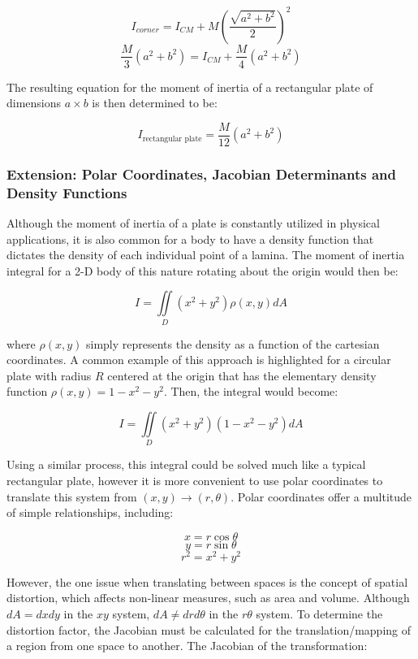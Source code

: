 \[I_{corner} = I_{CM} + M\left(\frac{\sqrt{a^2+b^2}}{2}\right)^2\]
\[\frac{M}{3}\left(a^2+b^2\right) = I_{CM} + \frac{M}{4}\left(a^2+b^2\right)\]

The resulting equation for the moment of inertia of a rectangular plate of dimensions $a \times b$ is then determined to be:

\begin{equation}
I_{\text{rectangular plate}} = \frac{M}{12}\left(a^2+b^2\right)
\label{eq:final_moment_rectangular_plate}
\end{equation}

\subsubsection{Extension: Polar Coordinates, Jacobian Determinants and Density Functions}

Although the moment of inertia of a plate is constantly utilized in physical applications, it is also common for a body to have a density function that dictates the density of each individual point of a lamina. The moment of inertia integral for a 2-D body of this nature rotating about the origin would then be:

\[I = \iint\limits_{D} (x^2+y^2)\rho(x,y) dA\]

where $\rho(x,y)$ simply represents the density as a function of the cartesian coordinates. A common example of this approach is highlighted for a circular plate with radius $R$ centered at the origin that has the elementary density function $\rho(x,y) = 1 - x^2 - y^2$. Then, the integral would become:

\[I = \iint\limits_{D} (x^2+y^2)(1 - x^2 - y^2) dA\]

Using a similar process, this integral could be solved much like a typical rectangular plate, however it is more convenient to use polar coordinates to translate this system from $(x,y) \rightarrow (r, \theta)$. Polar coordinates offer a multitude of simple relationships, including:

\[x = r\cos\theta\]
\[y = r\sin\theta\]
\[r^2 = x^2 + y^2\]

However, the one issue when translating between spaces is the concept of spatial distortion, which affects non-linear measures, such as area and volume. Although $dA = dxdy$ in the $xy$ system, $dA \neq drd\theta$ in the $r \theta$ system. To determine the distortion factor, the Jacobian must be calculated for the translation/mapping of a region from one space to another. The Jacobian of the transformation:

